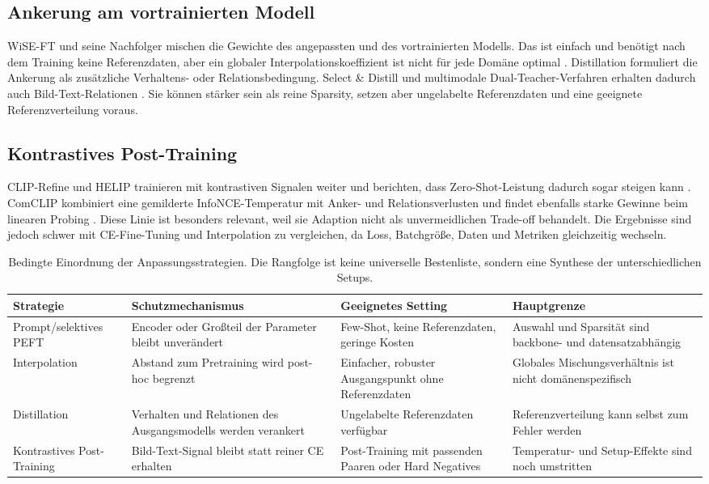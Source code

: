 \documentclass[conference]{IEEEtran}
\begin{document}
\subsection{Ankerung am vortrainierten Modell}
WiSE-FT und seine Nachfolger mischen die Gewichte des angepassten und des
vortrainierten Modells. Das ist einfach und benötigt nach dem Training keine
Referenzdaten, aber ein globaler Interpolationskoeffizient ist nicht für jede
Domäne optimal \cite{dawin}. Distillation formuliert die Ankerung als
zusätzliche Verhaltens- oder Relationsbedingung. Select \& Distill und
multimodale Dual-Teacher-Verfahren erhalten dadurch auch Bild-Text-Relationen
\cite{selectdistill, dualteacher}. Sie können stärker sein als reine
Sparsity, setzen aber ungelabelte Referenzdaten und eine geeignete
Referenzverteilung voraus.

\subsection{Kontrastives Post-Training}
CLIP-Refine und HELIP trainieren mit kontrastiven Signalen weiter und
berichten, dass Zero-Shot-Leistung dadurch sogar steigen kann
\cite{clipprefine, helip}. ComCLIP kombiniert eine gemilderte
InfoNCE-Temperatur mit Anker- und Relationsverlusten und findet ebenfalls
starke Gewinne beim linearen Probing \cite{comclip}. Diese Linie ist
besonders relevant, weil sie Adaption nicht als unvermeidlichen Trade-off
behandelt. Die Ergebnisse sind jedoch schwer mit CE-Fine-Tuning und
Interpolation zu vergleichen, da Loss, Batchgröße, Daten und Metriken
gleichzeitig wechseln.

\begin{table}[t]
\centering
\caption{Bedingte Einordnung der Anpassungsstrategien. Die Rangfolge ist keine
universelle Bestenliste, sondern eine Synthese der unterschiedlichen Setups.}
\label{tab:methoden}
\small
\begin{tabular}{p{2.8cm}p{3.4cm}p{3.4cm}p{4.1cm}}
\hline
\textbf{Strategie} & \textbf{Schutzmechanismus} & \textbf{Geeignetes Setting} & \textbf{Hauptgrenze}\\
\hline
Prompt/selektives PEFT & Encoder oder Großteil der Parameter bleibt unverändert & Few-Shot, keine Referenzdaten, geringe Kosten & Auswahl und Sparsität sind backbone- und datensatzabhängig\\
Interpolation & Abstand zum Pretraining wird post-hoc begrenzt & Einfacher, robuster Ausgangspunkt ohne Referenzdaten & Globales Mischungsverhältnis ist nicht domänenspezifisch\\
Distillation & Verhalten und Relationen des Ausgangsmodells werden verankert & Ungelabelte Referenzdaten verfügbar & Referenzverteilung kann selbst zum Fehler werden\\
Kontrastives Post-Training & Bild-Text-Signal bleibt statt reiner CE erhalten & Post-Training mit passenden Paaren oder Hard Negatives & Temperatur- und Setup-Effekte sind noch umstritten\\
\hline
\end{tabular}
\end{table}
\end{document}
